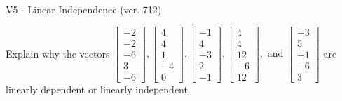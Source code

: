\begin{exercise}
  \begin{exerciseTitle}V5 - Linear Independence (ver. 712)\end{exerciseTitle}
  \begin{exerciseStatement}
    Explain why the vectors \(\left[\begin{array}{r}
-2 \\
-2 \\
-6 \\
3 \\
-6
\end{array}\right] , \left[\begin{array}{r}
4 \\
4 \\
1 \\
-4 \\
0
\end{array}\right] , \left[\begin{array}{r}
-1 \\
4 \\
-3 \\
2 \\
-1
\end{array}\right] , \left[\begin{array}{r}
4 \\
4 \\
12 \\
-6 \\
12
\end{array}\right] , \text{ and } \left[\begin{array}{r}
-3 \\
5 \\
-1 \\
-6 \\
3
\end{array}\right]\) are linearly dependent or linearly independent.	



\end{exerciseStatement}
\end{exercise}
